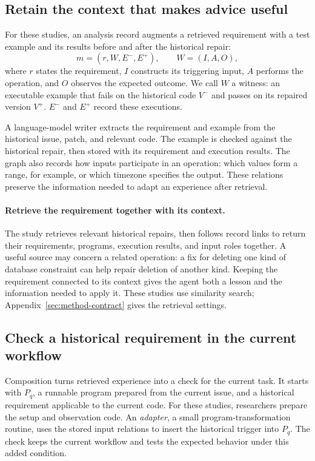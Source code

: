 \subsection{Retain the context that makes advice useful}\label{sec:store}
For these studies, an analysis record augments a retrieved requirement with
a test example and its results before and after the historical repair:
\begin{equation}
 m=(r,W,E^{-},E^{+}),\qquad W=(I,A,O),
 \label{eq:witness}
\end{equation}
where $r$ states the requirement, $I$ constructs its triggering input, $A$
performs the operation, and $O$ observes the expected outcome. We call $W$
a witness: an executable example that fails on the historical code $V^{-}$
and passes on its repaired version $V^{+}$. $E^{-}$ and $E^{+}$ record these executions.

A language-model writer extracts the requirement and example from the
historical issue, patch, and relevant code. The example is checked against
the historical repair, then stored with its requirement and execution results.
The graph also records how inputs participate in an operation: which values
form a range, for example, or which timezone specifies the output. These
relations preserve the information needed to adapt an experience after retrieval.

\paragraph{Retrieve the requirement together with its context.}
The study retrieves relevant historical repairs, then follows record links
to return their requirements, programs, execution results, and input roles
together. A useful source may concern a related operation: a fix for deleting
one kind of database constraint can help repair deletion of another kind.
Keeping the requirement connected to its context gives the agent both a
lesson and the information needed to apply it. These studies use
similarity search; Appendix~\ref{sec:method-contract} gives the retrieval
settings.

\subsection{Check a historical requirement in the current workflow}
\label{sec:compose}
Composition turns retrieved experience into a check for the current task.
It starts with $P_q$, a runnable program prepared from the current issue,
and a historical requirement applicable to the current code. For these
studies, researchers prepare the setup and observation code. An
\emph{adapter}, a small program-transformation routine, uses the stored input
relations to insert the historical trigger into $P_q$. The check keeps the
current workflow and tests the expected behavior under this added condition.

